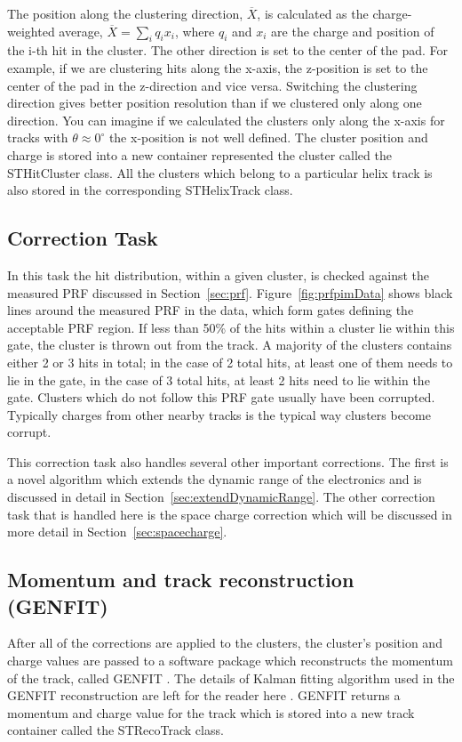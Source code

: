  The position along the clustering direction, $\overline{X}$, is calculated as the charge-weighted average, $\overline{X} = \sum_i q_ix_i$, where $q_i$ and $x_i$ are the charge and position of the i-th hit in the cluster. The other direction is set to the center of the pad. For example, if we are clustering hits along the x-axis, the z-position is set to the center of the pad in the z-direction and vice versa. Switching the clustering direction gives better position resolution than if we clustered only along one direction. You can imagine if we calculated the clusters only along the x-axis for tracks with $\theta \approx 0^{\circ}$ the x-position is not well defined. The cluster position and charge is stored into a new container represented the cluster called the STHitCluster class. All the clusters which belong to a particular helix track is also stored in the corresponding STHelixTrack class. 

\subsection{Correction Task}
In this task the hit distribution, within a given cluster, is checked against the measured PRF discussed in Section~\ref{sec:prf}. Figure~\ref{fig:prfpimData} shows black lines around the measured PRF in the data, which form gates defining the acceptable PRF region. If less than 50\% of the hits within a cluster lie within this gate, the cluster is thrown out from the track. A majority of the clusters contains either 2 or 3 hits in total; in the case of 2 total hits, at least one of them needs to lie in the gate, in the case of 3 total hits, at least 2 hits need to lie within the gate. Clusters which do not follow this PRF gate usually have been corrupted. Typically charges from other nearby tracks is the typical way clusters become corrupt.  


This correction task also handles several other important corrections. The first is a novel algorithm which extends the dynamic range of the electronics and is discussed in detail in Section~\ref{sec:extendDynamicRange}. The other correction task that is handled here is the space charge correction which will be discussed in more detail in Section~\ref{sec:spacecharge}. 

\subsection{Momentum and track reconstruction (GENFIT)}
After all of the corrections are applied to the clusters, the cluster's position and charge values are passed to a software package which reconstructs the momentum of the track, called GENFIT \cite{genfit}. The details of Kalman fitting algorithm used in the GENFIT reconstruction are left for the reader here \cite{genfit}. GENFIT returns a momentum and charge value for the track which is stored into a new track container called the STRecoTrack class. 

